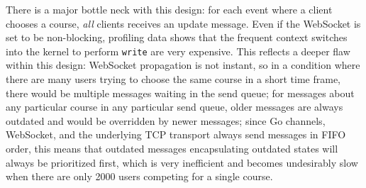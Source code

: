 There is a major bottle neck with this design: for each event where a
client chooses a course, \emph{all} clients receives an update
message. Even if the WebSocket is set to be non-blocking, profiling
data shows that the frequent context switches into the kernel to
perform \texttt{write} are very expensive. This reflects a deeper flaw
within this design: WebSocket propagation is not instant, so in a
condition where there are many users trying to choose the same course
in a short time frame, there would be multiple messages waiting in the
send queue; for messages about any particular course in any particular
send queue, older messages are always outdated and would be overridden
by newer messages; since Go channels, WebSocket, and the underlying
TCP transport always send messages in FIFO order, this means that
outdated messages encapsulating outdated states will always be
prioritized first, which is very inefficient and becomes undesirably
slow when there are only 2000 users competing for a single course.

